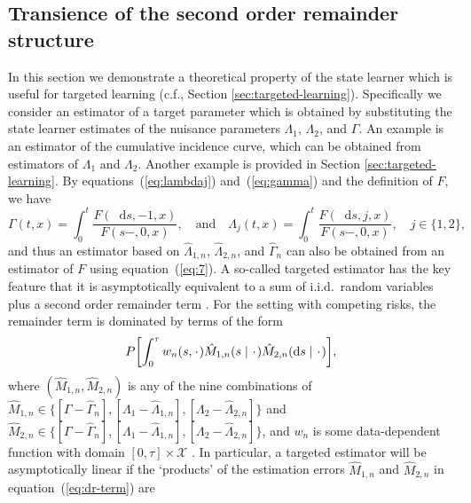 \documentclass[11pt]{article}
\theoremstyle{thmstyleone}%
\theoremstyle{thmstyletwo}%
\theoremstyle{thmstylethree}%
\newcommand{\blank}{\makebox[1ex]{\textbf{$\cdot$}}}
\newcommand*\diff{\mathop{}\!\mathrm{d}}
\newcommand{\1}{\mathds{1}}
\begin{document}
\subsection{Transience of the second order remainder structure}
\label{sec:trans-second-order}

In this section we demonstrate a theoretical property of the state
learner which is useful for targeted learning (c.f., Section
\ref{sec:targeted-learning}). Specifically we consider an estimator of
a target parameter which is obtained by substituting the state learner
estimates of the nuisance parameters $\Lambda_1$, $\Lambda_2$, and
$\Gamma$. An example is an estimator of the cumulative incidence
curve, which can be obtained from estimators of $\Lambda_1$ and
$\Lambda_2$. Another example is provided in Section \ref{sec:targeted-learning}.
By equations~(\ref{eq:lambdaj}) and~(\ref{eq:gamma}) and the definition of
\( F \), we have
\begin{equation}
  \label{eq:7}
  \Gamma(t , x) 
  = \int_0^t  \frac{F(\diff s, -1, x )}{F(s-, 0, x )},
  \quad \text{and} \quad
  \Lambda_j(t , x) 
  = \int_0^t  \frac{F(\diff s, j, x )}{F(s-, 0, x )},
  \quad j \in \{1,2\},
\end{equation}
and thus an estimator based on \( \hat{\Lambda}_{1,n} \),
\( \hat{\Lambda}_{2,n} \), and \( \hat{\Gamma}_{n} \) can also be obtained from
an estimator of $F$ using equation~(\ref{eq:7}). A so-called targeted estimator
has the key feature that it is asymptotically equivalent to a sum of i.i.d.\
random variables plus a second order remainder term
\citep{van2011targeted,hines2022demystifying}. For the setting with competing
risks, the remainder term is dominated by terms of the form
\begin{equation}
  \label{eq:dr-term}
  P{\left[
      \int_0^{\tau} w_n(s, \blank)
      \hat{M}_{1,n}(s \mid  \blank)
      \hat{M}_{2,n}(\diff s \mid  \blank)
    \right]},
\end{equation}
where \( (\hat{M}_{1,n}, \hat{M}_{2,n}) \) is any of the nine combinations of
\( \hat{M}_{1,n} \in \{[\Gamma -\hat{\Gamma}_n], [\Lambda_1
-\hat{\Lambda}_{1,n}], [\Lambda_2 -\hat{\Lambda}_{2,n}]\} \) and
\( \hat{M}_{2,n} \in \{[\Gamma -\hat{\Gamma}_n], [\Lambda_1
-\hat{\Lambda}_{1,n}], [\Lambda_2 -\hat{\Lambda}_{2,n}]\} \), and \( w_n \) is
some data-dependent function with domain \([0,\tau]\times\mathcal X \)
\citep{van2003unified}. In particular, a targeted estimator will be
asymptotically linear if the `products' of the estimation errors
\( \hat{M}_{1,n} \) and \( \hat{M}_{2,n} \) in equation~(\ref{eq:dr-term}) are
\end{document}
